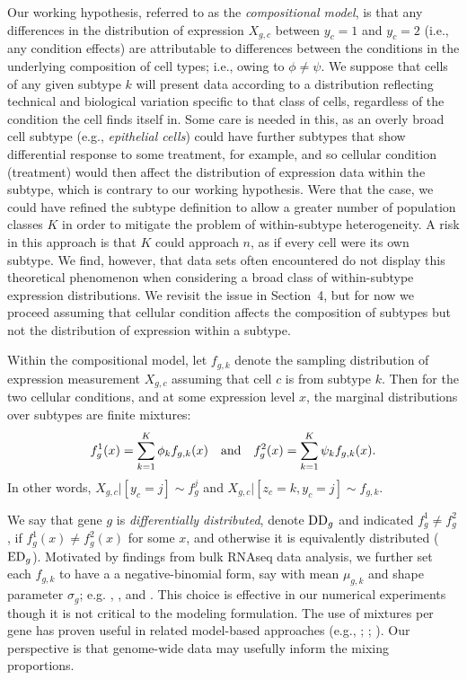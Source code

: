 \documentclass[aoas,preprint]{imsart}
\begin{document}
Our working hypothesis, referred to as the {\em compositional model},  is that any differences in the distribution of expression $X_{g,c}$ 
between $y_c=1$ and $y_c=2$ (i.e., any condition effects) are attributable 
to differences between the conditions 
in the underlying composition of cell types; i.e.,
owing to $\phi \neq \psi$.  We suppose that cells of any given subtype $k$ will
present data according to a distribution reflecting technical 
and biological variation specific to that class of cells, regardless of the 
condition the cell finds itself in.   Some care is needed in this, as an overly
broad cell subtype (e.g., {\em epithelial cells}) could have
further subtypes that show differential response to some treatment, for example,
and so cellular condition (treatment) would then affect the distribution of 
expression data within the subtype, which is contrary to our working hypothesis.
Were that the case,  we could have refined the subtype definition to allow a greater
number of population classes $K$ in order to mitigate the problem of within-subtype 
heterogeneity. A  risk in this approach is that $K$ could approach $n$, as if  
every cell were  its own subtype.  We find, however,
that data sets often encountered do not display this theoretical phenomenon
when considering a broad class of within-subtype expression distributions.
We revisit the issue in Section~4, but for now we proceed assuming 
that cellular condition affects the composition of subtypes but not the distribution of expression
within a subtype.

Within the compositional model, let $f_{g,k}$ denote the sampling distribution
of expression measurement $X_{g,c}$ assuming that cell $c$ is from subtype $k$.
Then for the two cellular conditions, and at some expression level $x$, 
the marginal distributions over subtypes are finite mixtures:
\begin{eqnarray*}
f_g^1(x) = \sum_{k=1}^K \phi_k f_{g,k} (x) \quad {\mbox {\rm and}} \quad
f_g^2(x) = \sum_{k=1}^K \psi_k f_{g,k} (x).
\end{eqnarray*}
In other words,  $X_{g,c} |[ y_c=j]  \sim f_g^j$  and $X_{g,c} |[ z_c=k, y_c=j] \sim f_{g,k}$.

We say that gene $g$ is {\em differentially distributed}, denote ${\rm DD}_g$ and indicated
$f_g^1 \neq f_g^2$,
if $f_g^1(x) \neq f_g^2(x)$ for some $x$, and otherwise it is equivalently distributed
(${\rm ED}_g$). Motivated by findings from bulk RNAseq data analysis, we further
set each $f_{g,k}$ to have a a negative-binomial form, say with mean $\mu_{g,k}$
and shape parameter $\sigma_g$; e.g. \cite{ref:Leng}, \cite{DES}, and \cite{ref:Des}. 
This choice is effective in our numerical experiments though it is 
not critical to the modeling formulation.  The use of mixtures per gene has proven
useful in related model-based approaches (e.g., 
\cite{ref:MAST}; \cite{McDavid:2014aa}; \cite{Huang:2018aa}).
Our perspective is that  genome-wide data may usefully inform the  mixing proportions.
\end{document}
